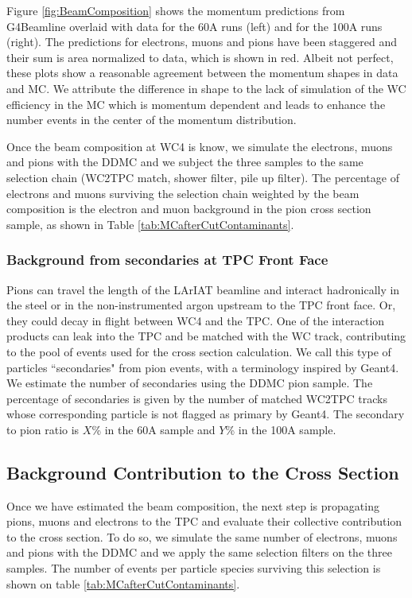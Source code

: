Figure \ref{fig:BeamComposition} shows the momentum predictions from G4Beamline overlaid with data for the 60A runs (left) and for the 100A runs (right). The predictions for electrons, muons and pions have been staggered and their sum is area normalized to data, which is shown in red. Albeit not perfect, these plots show a reasonable agreement between the momentum shapes in data and MC. We attribute  the difference in shape to the lack of simulation of the WC efficiency in the MC which is momentum dependent and leads to enhance the number events in the center of the momentum distribution.

Once the beam composition at WC4 is know,  we simulate the electrons, muons and pions with the DDMC and we subject the three samples to the same selection chain (WC2TPC match, shower filter, pile up filter). The percentage of electrons and muons surviving the selection chain weighted by the beam composition is the  electron and muon background in the pion cross section sample, as shown in Table \ref{tab:MCafterCutContaminants}.

\subsubsection{Background from secondaries at TPC Front Face}
Pions can travel the length of the LArIAT beamline and interact hadronically in the steel or in the non-instrumented argon upstream to the TPC front face. Or, they could decay in flight between WC4 and the TPC. One of the interaction products can leak into the TPC and be matched with the WC track, contributing to the pool of events used for the cross section calculation. We call this type of particles ``secondaries" from pion events, with a terminology inspired by Geant4. 
We estimate the number of secondaries using the DDMC pion sample.  The percentage of secondaries is given by the number of matched WC2TPC tracks whose corresponding particle is not flagged as primary by Geant4.  The secondary to pion ratio is $X$\% in the 60A sample and $Y$\% in the 100A sample.

\subsection{Background Contribution to the Cross Section}\label{sec:Correction}
Once we have estimated the beam composition, the next step is propagating pions, muons and electrons to the TPC and evaluate their collective contribution to the cross section. To do so, we simulate the same number of electrons, muons and pions with the DDMC and we apply the same selection filters on the three samples. The number of events per particle species surviving this selection is shown on table \ref{tab:MCafterCutContaminants}.

